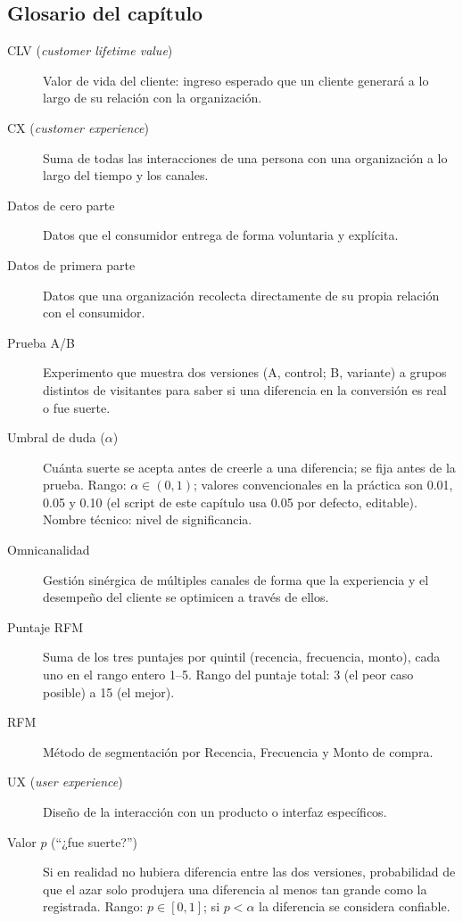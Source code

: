 \subsection*{Glosario del capítulo}
\begin{description}
  \item[CLV (\textit{customer lifetime value})] Valor de vida del cliente:
  ingreso esperado que un cliente generará a lo largo de su relación con la
  organización.
  \item[CX (\textit{customer experience})] Suma de todas las interacciones de
  una persona con una organización a lo largo del tiempo y los canales.
  \item[Datos de cero parte] Datos que el consumidor entrega de forma
  voluntaria y explícita.
  \item[Datos de primera parte] Datos que una organización recolecta
  directamente de su propia relación con el consumidor.
  \item[Prueba A/B] Experimento que muestra dos versiones (A, control; B,
  variante) a grupos distintos de visitantes para saber si una diferencia en
  la conversión es real o fue suerte.
  \item[Umbral de duda ($\alpha$)] Cuánta suerte se acepta antes de creerle a
  una diferencia; se fija antes de la prueba. Rango: $\alpha \in (0,1)$;
  valores convencionales en la práctica son 0.01, 0.05 y 0.10 (el script de
  este capítulo usa 0.05 por defecto, editable). Nombre técnico: nivel de
  significancia.
  \item[Omnicanalidad] Gestión sinérgica de múltiples canales de forma que la
  experiencia y el desempeño del cliente se optimicen a través de ellos.
  \item[Puntaje RFM] Suma de los tres puntajes por quintil (recencia,
  frecuencia, monto), cada uno en el rango entero 1--5. Rango del puntaje
  total: 3 (el peor caso posible) a 15 (el mejor).
  \item[RFM] Método de segmentación por Recencia, Frecuencia y Monto de
  compra.
  \item[UX (\textit{user experience})] Diseño de la interacción con un
  producto o interfaz específicos.
  \item[Valor $p$ (\enquote{¿fue suerte?})] Si en realidad no hubiera
  diferencia entre las dos versiones, probabilidad de que el azar solo
  produjera una diferencia al menos tan grande como la registrada. Rango:
  $p \in [0,1]$; si $p < \alpha$ la diferencia se considera confiable.
\end{description}

